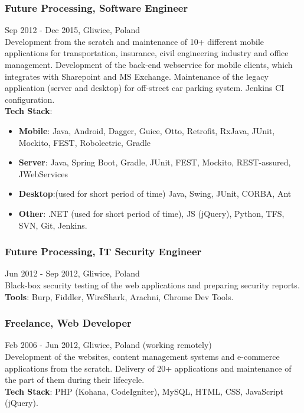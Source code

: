 \documentclass{article}
\begin{document}
      \subsubsection*{Future Processing, Software Engineer}
      Sep 2012 - Dec 2015, Gliwice, Poland\\[0.3em]
      Development from the scratch and maintenance of 10+ different mobile applications for transportation, insurance, civil engineering industry and office management. Development of the back-end webservice for mobile clients, which integrates with Sharepoint and MS Exchange. Maintenance of the legacy application (server and desktop) for off-street car parking system. Jenkins CI configuration.\\
      \textbf{Tech Stack}:
      \begin{itemize}
        \item \textbf{Mobile}: Java, Android, Dagger, Guice, Otto, Retrofit, RxJava, JUnit, Mockito, FEST, Robolectric, Gradle
        \item \textbf{Server}: Java, Spring Boot, Gradle, JUnit, FEST, Mockito, REST-assured, JWebServices
        \item \textbf{Desktop}:(used for short period of time) Java, Swing, JUnit, CORBA, Ant
        \item \textbf{Other}: .NET (used for short period of time), JS (jQuery), Python, TFS, SVN, Git, Jenkins.
      \end{itemize}

      \subsubsection*{Future Processing, IT Security Engineer}
      Jun 2012 - Sep 2012, Gliwice, Poland\\[0.3em]
      Black-box security testing of the web applications and preparing security reports.\\
      \textbf{Tools}: Burp, Fiddler, WireShark, Arachni, Chrome Dev Tools.

      \subsubsection*{Freelance, Web Developer}
      Feb 2006 - Jun 2012, Gliwice, Poland (working remotely)\\[0.3em]
      Development of the websites, content management systems and e-commerce applications from the scratch.
      Delivery of 20+ applications and maintenance of the part of them during their lifecycle.\\
      \textbf{Tech Stack}: PHP (Kohana, CodeIgniter), MySQL, HTML, CSS, JavaScript (jQuery).
      
\end{document}

